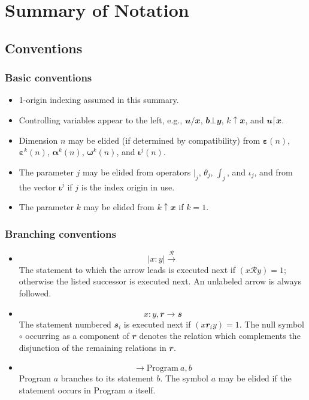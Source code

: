 
\chapter{Summary of Notation}

\section{Conventions}

\subsection{Basic conventions}
\begin{itemize}
	\item 1-origin indexing assumed in this summary.
	\item Controlling variables appear to the left, e.g., \( \mathbfit{u}/\mathbfit{x} \), \( \mathbfit{b}⊥\mathbfit{y} \), \( k↑\mathbfit{x} \), and \( \mathbfit{u}⌈\mathbfit{x} \). 
	\item Dimension \( n \) may be elided (if determined by compatibility) from \( \mathbf{ε}(n) \), \( \mathbf{ε}^k(n) \), \( \mathbf{α}^k(n) \), \( \mathbf{ω}^k(n) \), and \( \mathbf{ι}^j(n) \).
	\item The parameter \( j \) may be elided from operators \( |_j \), \( θ_j \), \( ∫_j \), and \( ι_j \), and from the vector \( \mathbf{ι}^j \) if \( j \) is the index origin in use.
	\item The parameter \( k \) may be elided from \( k↑\mathbfit{x} \) if \( k=1 \).
\end{itemize}


\subsection{Branching conventions}
\begin{itemize}
	\item \[ \left| x : y \right| \overset{\mathcal{R}}{\rightarrow} \]
	The statement to which the arrow leads is executed next if \( \left( x \mathcal{R} y \right) = 1 \); otherwise the listed successor is executed next. An unlabeled arrow is always followed.
	\item \[ x:y, \mathbfit{r} → \mathbfit{s} \]
	The statement numbered \( \mathbfit{s}_i \) is executed next if \( \left( x \mathbfit{r}_i y \right) = 1 \). The null symbol \( ∘ \) occurring as a component of \( \mathbfit{r} \) denotes the relation which complements the disjunction of the remaining relations in \( \mathbfit{r} \).
	\item \[ → \mathup{Program}\ a,b \]
	Program \( a \) branches to its statement \( b \). The symbol \( a \) may be elided if the statement occurs in Program \( a \) itself.
\end{itemize}

